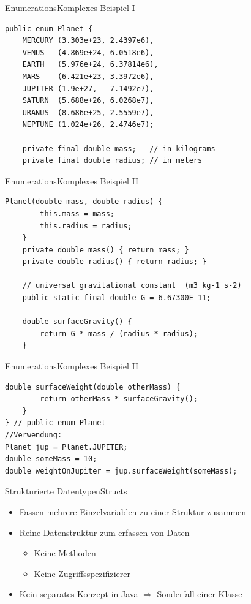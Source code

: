 \begin{frame}[fragile]{Enumerations}{Komplexes Beispiel I}
\lstset{style=javacode}
\begin{lstlisting}
public enum Planet {
    MERCURY (3.303e+23, 2.4397e6),
    VENUS   (4.869e+24, 6.0518e6),
    EARTH   (5.976e+24, 6.37814e6),
    MARS    (6.421e+23, 3.3972e6),
    JUPITER (1.9e+27,   7.1492e7),
    SATURN  (5.688e+26, 6.0268e7),
    URANUS  (8.686e+25, 2.5559e7),
    NEPTUNE (1.024e+26, 2.4746e7);

    private final double mass;   // in kilograms
    private final double radius; // in meters
\end{lstlisting}
\end{frame}

\begin{frame}[fragile]{Enumerations}{Komplexes Beispiel II}
\lstset{style=javacode}
\begin{lstlisting}[firstnumber=13]
    Planet(double mass, double radius) {
        this.mass = mass;
        this.radius = radius;
    }
    private double mass() { return mass; }
    private double radius() { return radius; }

    // universal gravitational constant  (m3 kg-1 s-2)
    public static final double G = 6.67300E-11;

    double surfaceGravity() {
        return G * mass / (radius * radius);
    }
\end{lstlisting}
\end{frame}

\begin{frame}[fragile]{Enumerations}{Komplexes Beispiel II}
\lstset{style=javacode}
\begin{lstlisting}[firstnumber=26]
    double surfaceWeight(double otherMass) {
        return otherMass * surfaceGravity();
    }
} // public enum Planet
//Verwendung:
Planet jup = Planet.JUPITER;
double someMass = 10;
double weightOnJupiter = jup.surfaceWeight(someMass);
\end{lstlisting}
\end{frame}

\begin{frame}{Strukturierte Datentypen}{Structs}
    \begin{itemize}
        \item Fassen mehrere Einzelvariablen zu einer Struktur zusammen
        \item Reine Datenstruktur zum erfassen von Daten
        \begin{itemize}
            \item Keine Methoden
            \item Keine Zugriffsspezifizierer
        \end{itemize}
        \item Kein separates Konzept in Java $\Rightarrow$ Sonderfall einer Klasse
    \end{itemize}
\end{frame}

